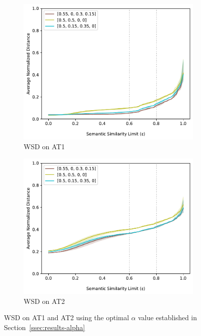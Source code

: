 \newcommand{\WSDWidth}{.45\linewidth}
\begin{figure}[t]
    \centering
    \begin{subfigure}[b]{\WSDWidth}
\includegraphics[width=\linewidth]{code/img/wsd-at1-3alphas-no-background.pdf}
        \caption{WSD on AT1}
        \label{fig:wsd-at1}
    \end{subfigure}
    \begin{subfigure}[b]{\WSDWidth}
\includegraphics[width=\linewidth]{code/img/wsd-at2-3alphas-no-background.pdf}
        \caption{WSD on AT2}
        \label{fig:wsd-at2}
    \end{subfigure}
    \caption{WSD on AT1 and AT2 using the optimal $\alpha$ value established in Section~\ref{ssec:results-alpha}}
    \label{fig:wsd}
\end{figure}

